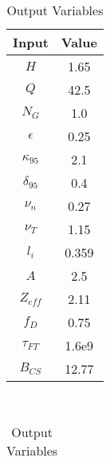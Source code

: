 \begin{table}[b!]
\centering
\caption{ACT I Variables}
\hfill
\begin{subtable}[t]{0.4\textwidth}
\centering
\caption{Input Variables} ~\\
\begin{tabular}{ c|c }

Input            & Value           \\
\hline
$H$              & 1.65            \\
$Q$              & 42.5            \\
$N_{G}$          & 1.0             \\
$\epsilon$       & 0.25            \\
$\kappa_{95}$    & 2.1             \\
$\delta_{95}$    & 0.4             \\
$\nu_{n}$        & 0.27            \\
$\nu_{T}$        & 1.15            \\
$l_{i}$          & 0.359         \\
$A$              & 2.5             \\
$Z_{eff}$        & 2.11            \\
$f_{D}$          & 0.75            \\
$\tau_{FT}$      & 1.6e9           \\
$B_{CS}$         & 12.77           \\

\end{tabular}
\end{subtable}
\hfill
\begin{subtable}[t]{0.5\textwidth}
\centering
\caption{Output Variables} ~\\
\begin{tabular}{ c|c|c }


\end{tabular}
\end{subtable}
\end{table}

